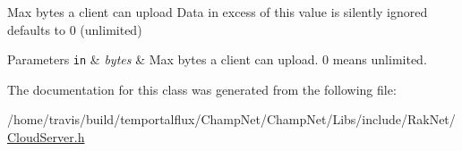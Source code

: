 Max bytes a client can upload Data in excess of this value is silently ignored defaults to 0 (unlimited) 


\begin{DoxyParams}[1]{Parameters}
\mbox{\tt in}  & {\em bytes} & Max bytes a client can upload. 0 means unlimited. \\
\hline
\end{DoxyParams}


The documentation for this class was generated from the following file\-:\begin{DoxyCompactItemize}
\item 
/home/travis/build/temportalflux/\-Champ\-Net/\-Champ\-Net/\-Libs/include/\-Rak\-Net/\hyperlink{_cloud_server_8h}{Cloud\-Server.\-h}\end{DoxyCompactItemize}
